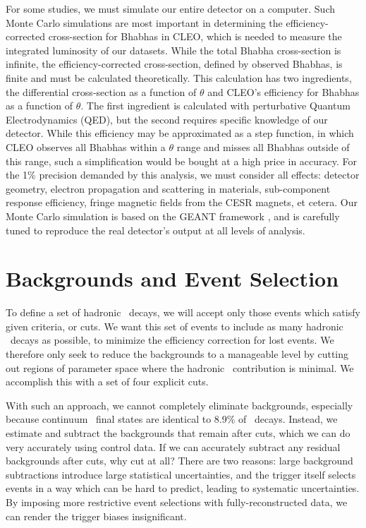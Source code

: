 \documentclass{cornell}
\begin{document}
For some studies, we must simulate our entire detector on a computer.
Such Monte Carlo simulations are most important in determining the
efficiency-corrected cross-section for Bhabhas in CLEO, which is
needed to measure the integrated luminosity of our datasets.  While
the total Bhabha cross-section is infinite, the efficiency-corrected
cross-section, defined by observed Bhabhas, is finite and must be
calculated theoretically.  This calculation has two ingredients, the
differential cross-section as a function of $\theta$ and CLEO's
efficiency for Bhabhas as a function of $\theta$.  The first
ingredient is calculated with perturbative Quantum Electrodynamics
(QED), but the second requires specific knowledge of our detector.
While this efficiency may be approximated as a step function, in which
CLEO observes all Bhabhas within a $\theta$ range and misses all
Bhabhas outside of this range, such a simplification would be bought
at a high price in accuracy.  For the 1\% precision demanded by this
analysis, we must consider all effects: detector geometry, electron
propagation and scattering in materials, sub-component response
efficiency, fringe magnetic fields from the CESR magnets, et cetera.
Our Monte Carlo simulation is based on the GEANT framework
\cite{geant}, and is carefully tuned to reproduce the real detector's
output at all levels of analysis.

\chapter{Backgrounds and Event Selection}
\label{chp:backgrounds}

To define a set of hadronic \ups\ decays, we will accept only those
events which satisfy given criteria, or cuts.  We want this set of
events to include as many hadronic \ups\ decays as possible, to
minimize the efficiency correction for lost events.  We therefore only
seek to reduce the backgrounds to a manageable level by cutting out
regions of parameter space where the hadronic \ups\ contribution is
minimal.  We accomplish this with a set of four explicit cuts.

With such an approach, we cannot completely eliminate backgrounds,
especially because continuum \qqbar\ final states are identical to
8.9\% of \ups\ decays.  Instead, we estimate and subtract the
backgrounds that remain after cuts, which we can do very accurately
using control data.  If we can accurately subtract any residual
backgrounds after cuts, why cut at all?  There are two reasons: large
background subtractions introduce large statistical uncertainties, and
the trigger itself selects events in a way which can be hard to
predict, leading to systematic uncertainties.  By imposing more
restrictive event selections with fully-reconstructed data, we can
render the trigger biases insignificant.
\end{document}
